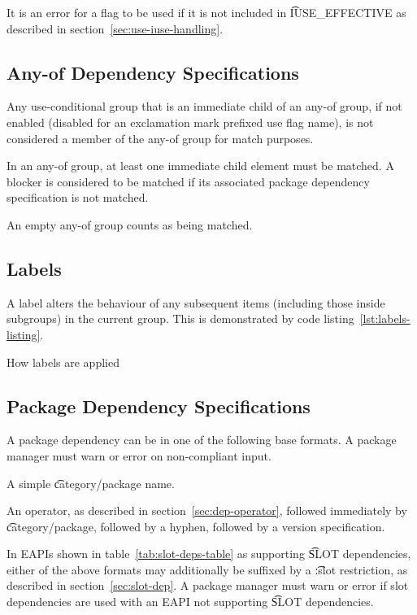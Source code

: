 It is an error for a flag to be used if it is not included in \t{IUSE\_EFFECTIVE} as described in
section~\ref{sec:use-iuse-handling}.

\subsection{Any-of Dependency Specifications}

Any use-conditional group that is an immediate child of an any-of group, if not enabled (disabled
for an exclamation mark prefixed use flag name), is not considered a member of the any-of group
for match purposes.

In an any-of group, at least one immediate child element must be matched. A blocker is
considered to be matched if its associated package dependency specification is not matched.

An empty any-of group counts as being matched.

\IFKDEBUILDELSE
{
    \subsection{Labels}
    \label{sec:labels}

    A label alters the behaviour of any subsequent items (including those inside subgroups) in the
    current group. This is demonstrated by code listing~\ref{lst:labels-listing}.

\begin{listing}
  \caption{How labels are applied}\label{lst:labels-listing}
  
\end{listing}
}{
}

\subsection{Package Dependency Specifications}

A package dependency can be in one of the following base formats. A package manager must warn or
error on non-compliant input.

\begin{compactitem}
\item A simple \t{category/package} name.
\item An operator, as described in section~\ref{sec:dep-operator}, followed immediately by
    \t{category/package}, followed by a hyphen, followed by a version specification.
\end{compactitem}

In EAPIs shown in table~\ref{tab:slot-deps-table} as supporting \t{SLOT} dependencies, either of the
above formats may additionally be suffixed by a \t{:slot} restriction, as described in
section~\ref{sec:slot-dep}. A package manager must warn or error if slot dependencies are used with an
EAPI not supporting \t{SLOT} dependencies.

